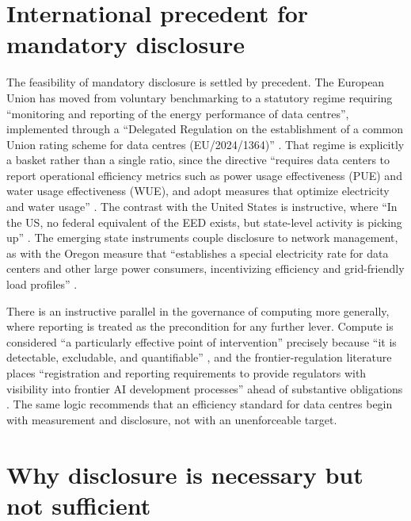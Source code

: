 \section{International precedent for mandatory disclosure}
\label{sec:supp:pue:precedent}

The feasibility of mandatory disclosure is settled by precedent. The European Union has moved from voluntary benchmarking to a statutory regime requiring \enquote{monitoring and reporting of the energy performance of data centres}, implemented through a \enquote{Delegated Regulation on the establishment of a common Union rating scheme for data centres (EU/2024/1364)} \autocite{ecEnergyPerformanceDataCentres2024}. That regime is explicitly a basket rather than a single ratio, since the directive \enquote{requires data centers to report operational efficiency metrics such as power usage effectiveness (PUE) and water usage effectiveness (WUE), and adopt measures that optimize electricity and water usage} \autocite{datacenterKnowledgeCompliance2026}. The contrast with the United States is instructive, where \enquote{In the US, no federal equivalent of the EED exists, but state-level activity is picking up} \autocite{datacenterKnowledgeCompliance2026}. The emerging state instruments couple disclosure to network management, as with the Oregon measure that \enquote{establishes a special electricity rate for data centers and other large power consumers, incentivizing efficiency and grid-friendly load profiles} \autocite{datacenterKnowledgeCompliance2026}.

There is an instructive parallel in the governance of computing more generally, where reporting is treated as the precondition for any further lever. Compute is considered \enquote{a particularly effective point of intervention} precisely because \enquote{it is detectable, excludable, and quantifiable} \autocite{sastryComputingPowerGovernance2024}, and the frontier-regulation literature places \enquote{registration and reporting requirements to provide regulators with visibility into frontier AI development processes} ahead of substantive obligations \autocite{anderljungFrontierAIRegulation2023}. The same logic recommends that an efficiency standard for data centres begin with measurement and disclosure, not with an unenforceable target.

\section{Why disclosure is necessary but not sufficient}
\label{sec:supp:pue:nec}

